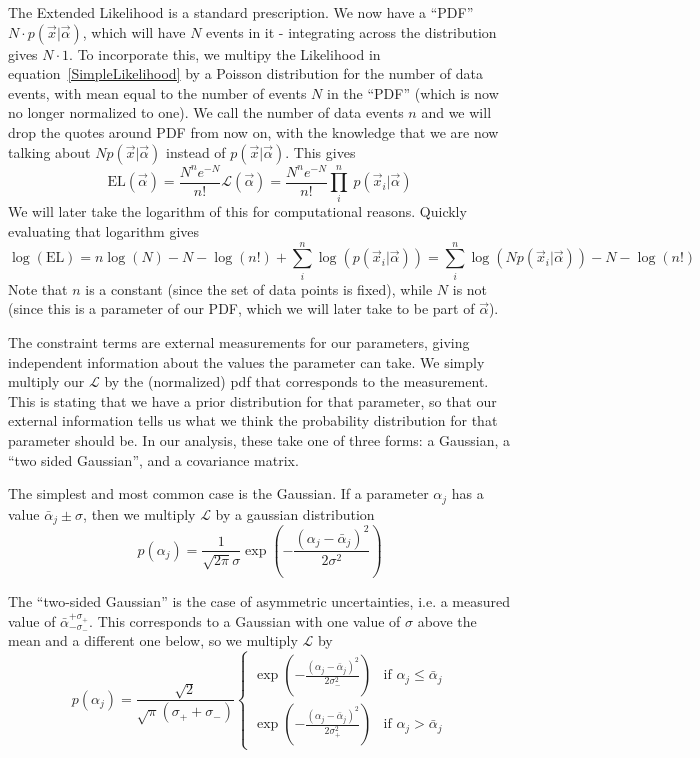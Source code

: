 The Extended Likelihood is a standard prescription.  We now have a
``PDF'' $N \cdot p(\vec{x}|\vec{\alpha})$, which will have $N$ events
in it - integrating across the distribution gives $N\cdot1$.  To
incorporate this, we multipy the Likelihood in \mbox{equation
\ref{SimpleLikelihood}} by a Poisson distribution for the number of
data events, with mean equal to the number of events $N$ in the
``PDF'' (which is now no longer normalized to one).  We call the
number of data events $n$ and we will drop the quotes around PDF from
now on, with the knowledge that we are now talking about $N
p(\vec{x}|\vec{\alpha})$ instead of $p(\vec{x}|\vec{\alpha})$.  This
gives
\begin{equation}
\mathrm{EL}(\vec{\alpha}) = \frac{N^n e^{-N}}{n!} \mathcal{L}(\vec{\alpha})
= \frac{N^n e^{-N}}{n!} \prod_i^n\ p(\vec{x}_i|\vec{\alpha})
\end{equation}
We will later take the logarithm of this for computational reasons.
Quickly evaluating that logarithm gives
\begin{equation}
\log(\mathrm{EL}) = n \log(N) - N - \log(n!) + \sum_i^n \log(p(\vec{x}_i
| \vec{\alpha})) = \sum_i^n \log(N p(\vec{x}_i | \vec{\alpha})) - N -
\log(n!)
\end{equation}
Note that $n$ is a constant (since the set of data points is fixed),
while $N$ is not (since this is a parameter of our PDF, which we will
later take to be part of $\vec{\alpha}$).

The constraint terms are external measurements for our parameters,
giving independent information about the values the parameter can
take.  We simply multiply our $\mathcal{L}$ by the (normalized) pdf
that corresponds to the measurement.  This is stating that we have a
prior distribution for that parameter, so that our external
information tells us what we think the probability distribution for
that parameter should be. In our analysis, these take one of three
forms: a Gaussian, a ``two sided Gaussian'', and a covariance matrix.

The simplest and most common case is the Gaussian.  If a parameter
$\alpha_j$ has a value $\bar{\alpha}_j \pm \sigma$, then we multiply
$\mathcal{L}$ by a gaussian distribution
\begin{equation}
p(\alpha_j) =
\frac{1}{\sqrt{2\pi}\sigma}\exp\left(-\frac{(\alpha_j-\bar{\alpha}_j)^2}
{2\sigma^2}\right)
\end{equation}

The ``two-sided Gaussian'' is the case of asymmetric uncertainties,
i.e. a measured value of $\bar{\alpha}^{+\sigma_+}_{-\sigma_-}$.  This
corresponds to a Gaussian with one value of $\sigma$ above the mean
and a different one below, so we multiply $\mathcal{L}$ by
\begin{equation}
p(\alpha_j) = \frac{\sqrt{2}}{\sqrt{\pi}(\sigma_+ + \sigma_-)}\left\{
\begin{array}{rl}
\exp\left(-\frac{(\alpha_j-\bar{\alpha}_j)^2}
{2\sigma_-^2}\right) & \text{if } \alpha_j \leq \bar{\alpha}_j\\
\exp\left(-\frac{(\alpha_j-\bar{\alpha}_j)^2}
{2\sigma_+^2}\right) & \text{if } \alpha_j > \bar{\alpha}_j
\end{array} \right.
\end{equation}

